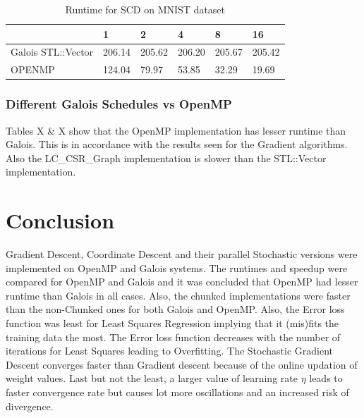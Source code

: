 \documentclass{sigplanconf}
\begin{document}
{\begin{table}[htbp]
\caption{Runtime for SCD on MNIST dataset}
\begin{tabular}{|p{7em}|p{2.5em}|p{2.5em}|p{2.5em}|p{2em}|p{2.5em}|}
\hline
 & 1 & 2 & 4 & 8 & 16 \\ \hline
Galois STL::Vector & 206.14 & 205.62 & 206.20 & 205.67 & 205.42 \\ \hline
OPENMP & 124.04 & 79.97 & 53.85 & 32.29 & 19.69 \\ \hline
\end{tabular}
\label{Label of the table}
\end{table}


\subsubsection{Different Galois Schedules vs OpenMP}
Tables X \& X show that the OpenMP implementation has lesser runtime than Galois. This is in accordance with the results seen for the Gradient
algorithms. Also the LC\_CSR\_Graph implementation is slower than the STL::Vector implementation. 

\section{Conclusion}
Gradient Descent, Coordinate Descent and their parallel Stochastic versions were implemented on OpenMP and Galois systems. The runtimes and speedup
were compared for OpenMP and Galois and it was concluded that OpenMP had lesser runtime than Galois in all cases. Also, the chunked implementations
were faster than the non-Chunked ones for both Galois and OpenMP. Also, the Error loss function was least for Least Squares Regression implying that it
(mis)fits the training data the most. The Error loss function decreases with the number of iterations for Least Squares leading to Overfitting. The Stochastic
Gradient Descent converges faster than Gradient descent because of the online updation of weight values. Last but not the least, a larger value of learning
rate \(\eta\) leads to faster convergence rate but causes lot more oscillations and an increased risk of divergence.



%

\begin{thebibliography}{}
\softraggedright


\end{thebibliography}}
\end{document}
